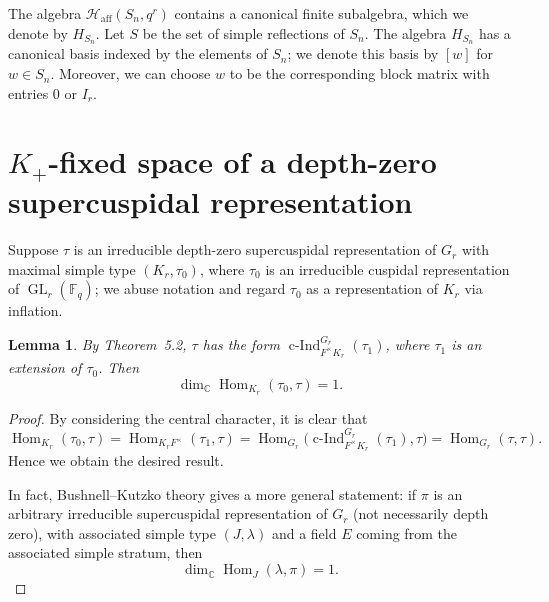 \documentclass[12pt]{article}
\newtheorem{lemma}[theorem]{Lemma}
\theoremstyle{remark}
\begin{document}
The algebra $\mathcal{H}_{\mathrm{aff}}(S_n, q^r)$ contains a canonical finite subalgebra, which we denote by $H_{S_n}$. Let $S$ be the set of simple reflections of $S_n$. The algebra $H_{S_n}$ has a canonical basis indexed by the elements of $S_n$; we denote this basis by $[w]$ for $w \in S_n$. Moreover, we can choose $w$ to be the corresponding block matrix with entries $0$ or $I_r$.

\section{$K_+$-fixed space of a depth-zero supercuspidal representation}

Suppose $\tau$ is an irreducible depth-zero supercuspidal representation of $G_r$ with maximal simple type $(K_r,\tau_0)$, where $\tau_0$ is an irreducible cuspidal representation of $\operatorname{GL}_r(\mathbb{F}_q)$; we abuse notation and regard $\tau_0$ as a representation of $K_r$ via inflation.

\begin{lemma}
By Theorem~5.2, $\tau$ has the form $\operatorname{c-Ind}_{F^{\times} K_r}^{G_r}(\tau_1)$, where $\tau_1$ is an extension of $\tau_0$. Then
\[
\dim_{\mathbb{C}} \operatorname{Hom}_{K_r}(\tau_0,\tau) = 1 .
\]
\end{lemma}
\begin{proof}
By considering the central character, it is clear that
\[
\operatorname{Hom}_{K_r}(\tau_0,\tau) = \operatorname{Hom}_{K_r F^{\times}}(\tau_1,\tau)
= \operatorname{Hom}_{G_r}\bigl( \operatorname{c-Ind}_{F^{\times} K_r}^{G_r}(\tau_1), \tau \bigr)
= \operatorname{Hom}_{G_r}(\tau,\tau) .
\]
Hence we obtain the desired result.

In fact, Bushnell--Kutzko theory gives a more general statement: if $\pi$ is an arbitrary irreducible supercuspidal representation of $G_r$ (not necessarily depth zero), with associated simple type $(J,\lambda)$ and a field $E$ coming from the associated simple stratum, then
\[
\dim_{\mathbb{C}} \operatorname{Hom}_J(\lambda,\pi) = 1 .
\]
\end{proof}
\end{document}

